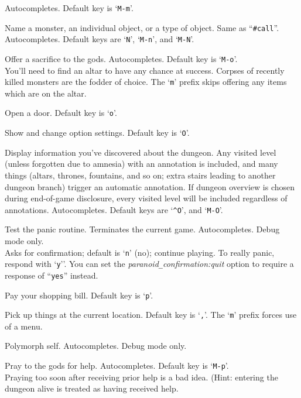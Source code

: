 Autocompletes. Default key is `{\tt M-m}'.
\item[\tb{\#name}]
Name a monster, an individual object, or a type of object.
Same as ``{\tt \#call}''.
Autocompletes.
Default keys are `{\tt N}', `{\tt M-n}', and `{\tt M-N}'.
\item[\tb{\#offer}]
Offer a sacrifice to the gods. Autocompletes. Default key is `{\tt M-o}'.\\
You'll need to find an altar to have any chance at success.
Corpses of recently killed monsters are the fodder of choice.
The `{\tt m}' prefix skips offering any items which are on the altar.\\
\item[\tb{\#open}]
Open a door. Default key is `{\tt o}'.
\item[\tb{\#options}]
Show and change option settings. Default key is `{\tt O}'.
\item[\tb{\#overview}]
Display information you've discovered about the dungeon.  Any visited
level (unless forgotten due to amnesia) with an annotation is included,
and many things (altars, thrones, fountains, and so on; extra stairs
leading to another dungeon branch) trigger an automatic annotation.
If dungeon overview is chosen during end-of-game disclosure, every visited
level will be included regardless of annotations. Autocompletes.
Default keys are `{\tt \^{}O}', and `{\tt M-O}'.
\item[\tb{\#panic}]
Test the panic routine.
Terminates the current game.
Autocompletes.
Debug mode only.\\
Asks for confirmation; default is `{\tt n}' (no); continue playing.
To really panic, respond with `{\tt y}''.
You can set the
{\it paranoid\verb+_+confirmation:quit\/}
option to require a response of ``{\tt yes}'' instead.
\item[\tb{\#pay}]
Pay your shopping bill. Default key is `{\tt p}'.
\item[\tb{\#pickup}]
Pick up things at the current location. Default key is `{\tt ,}'.
The `{\tt m}' prefix forces use of a menu.
\item[\tb{\#polyself}]
Polymorph self.
Autocompletes.
Debug mode only.
\item[\tb{\#pray}]
Pray to the gods for help. Autocompletes. Default key is `{\tt M-p}'.\\
Praying too soon after receiving prior help is a bad idea.
(Hint: entering the dungeon alive is treated as having received help.
